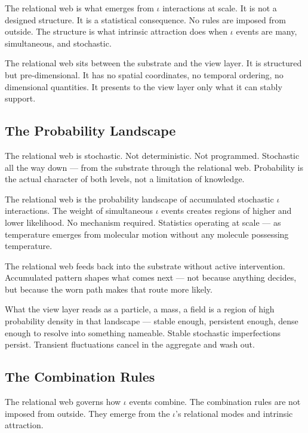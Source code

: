 \documentclass[11pt,letterpaper]{article}
\begin{document}
The relational web is what emerges from \(\iota\) interactions at scale. It is not a designed structure. It is a statistical consequence. No rules are imposed from outside. The structure is what intrinsic attraction does when \(\iota\) events are many, simultaneous, and stochastic.

The relational web sits between the substrate and the view layer. It is structured but pre-dimensional. It has no spatial coordinates, no temporal ordering, no dimensional quantities. It presents to the view layer only what it can stably support.

\subsection{The Probability Landscape}
\label{sec:org68e83e9}

The relational web is stochastic. Not deterministic. Not programmed. Stochastic all the way down --- from the substrate through the relational web. Probability is the actual character of both levels, not a limitation of knowledge.

The relational web is the probability landscape of accumulated stochastic \(\iota\) interactions. The weight of simultaneous \(\iota\) events creates regions of higher and lower likelihood. No mechanism required. Statistics operating at scale --- as temperature emerges from molecular motion without any molecule possessing temperature.

The relational web feeds back into the substrate without active intervention. Accumulated pattern shapes what comes next --- not because anything decides, but because the worn path makes that route more likely.

What the view layer reads as a particle, a mass, a field is a region of high probability density in that landscape --- stable enough, persistent enough, dense enough to resolve into something nameable. Stable stochastic imperfections persist. Transient fluctuations cancel in the aggregate and wash out.

\subsection{The Combination Rules}
\label{sec:org8db61db}

The relational web governs how \(\iota\) events combine. The combination rules are not imposed from outside. They emerge from the \(\iota\)'s relational modes and intrinsic attraction.
\end{document}
